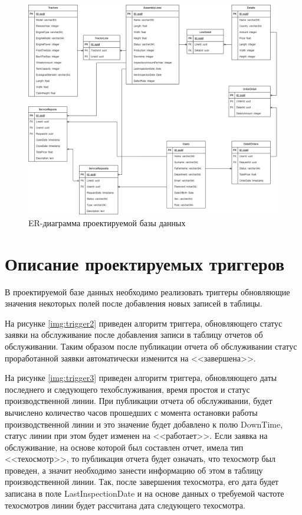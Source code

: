 \begin{figure}[H]
    \centering
    \includegraphics[width=1\textwidth]{templates/coursework/inc/img/er.png}
    \caption{ER-диаграмма проектируемой базы данных}
    \label{img:erdb}
\end{figure}

\section{Описание проектируемых триггеров}

В проектируемой базе данных необходимо реализовать триггеры обновляющие значения некоторых полей после добавления новых записей в таблицы. 

На рисунке \ref{img:trigger2} приведен алгоритм триггера, обновляющего статус заявки на обслуживание после добавления записи в таблицу отчетов об обслуживании. Таким образом после публикации отчета об обслуживании статус проработанной заявки автоматически изменится на <<завершена>>.

На рисунке \ref{img:trigger3} приведен алгоритм триггера, обновляющего даты последнего и следующего техобслуживания, время простоя и статус производственной линии. При публикации отчета об обслуживании, будет вычислено количество часов прошедших с момента остановки работы производственной линии и это значение будет добавлено к полю DownTime, статус линии при этом будет изменен на <<работает>>. Если заявка на обслуживание, на основе которой был составлен отчет, имела тип <<техосмотр>>, то публикация отчета будет означать, что техосмотр был проведен, а значит необходимо занести информацию об этом в таблицу производственной линии. Так, после завершения техосмотра, его дата будет записана в поле LastInspectionDate и на основе данных о требуемой частоте техосмотров линии будет рассчитана дата следующего техосмотра.

